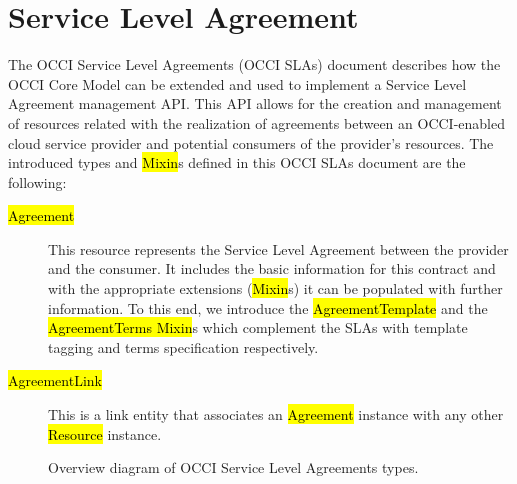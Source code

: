 \documentclass[10pt,a4paper]{article}
\begin{document}
\section{Service Level Agreement}

The OCCI Service Level Agreements (OCCI SLAs) document describes how the OCCI Core Model \cite{occi:core} can be extended and used to implement a Service Level Agreement management API. This API allows for the creation and management of resources related with the realization of agreements between an OCCI-enabled cloud service provider and potential consumers of the provider’s resources. The introduced types and \hl{Mixin}s defined in this OCCI SLAs document are the following:


\begin{description}
\item[\hl{Agreement }] This resource represents the Service Level Agreement between the provider and the consumer. It includes the basic information for this contract and with the appropriate extensions (\hl{Mixin}s) it can be populated with further information. To this end, we introduce the \hl{AgreementTemplate} and the \hl{AgreementTerms Mixin}s which complement the SLAs with template tagging and terms specification respectively.

\item[\hl{AgreementLink }] This is a link entity that associates an \hl{Agreement} instance with any other \hl{Resource} instance.
\end{description}


\begin{figure}[!h]
	{\centering {} \par}
	\caption{Overview diagram of OCCI Service Level Agreements types.}
	\label{fig:sla_uml}
\end{figure}
\end{document}
